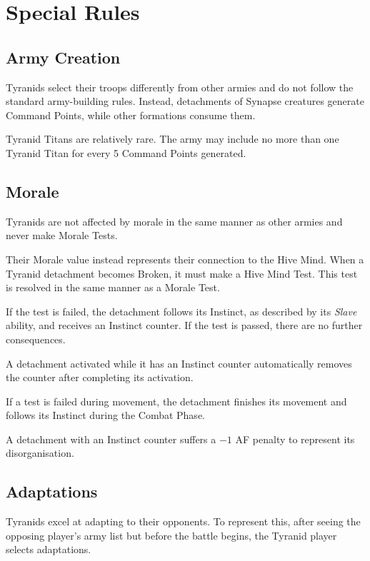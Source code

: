 \section{Special Rules}

\subsection{Army Creation}

Tyranids select their troops differently from other armies and do not follow the standard army-building rules. Instead, detachments of Synapse creatures generate Command Points, while other formations consume them.

Tyranid Titans are relatively rare. The army may include no more than one Tyranid Titan for every 5 Command Points generated.

\subsection{Morale}

Tyranids are not affected by morale in the same manner as other armies and never make Morale Tests.

Their Morale value instead represents their connection to the Hive Mind. When a Tyranid detachment becomes Broken, it must make a Hive Mind Test. This test is resolved in the same manner as a Morale Test.

If the test is failed, the detachment follows its Instinct, as described by its \textit{Slave} ability, and receives an Instinct counter. If the test is passed, there are no further consequences.

A detachment activated while it has an Instinct counter automatically removes the counter after completing its activation.

If a test is failed during movement, the detachment finishes its movement and follows its Instinct during the Combat Phase.

A detachment with an Instinct counter suffers a $-1$ AF penalty to represent its disorganisation.

\subsection{Adaptations}

Tyranids excel at adapting to their opponents. To represent this, after seeing the opposing player's army list but before the battle begins, the Tyranid player selects adaptations.

